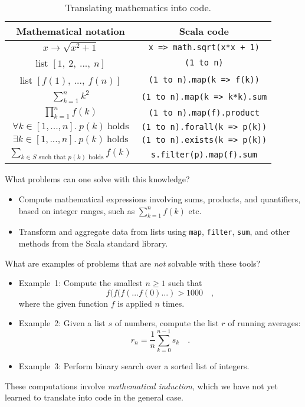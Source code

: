 \begin{table}
\begin{centering}
\begin{tabular}{|c|c|}
\hline 
\textbf{Mathematical notation} & \textbf{Scala code}\tabularnewline
\hline 
\hline 
$x\rightarrow\sqrt{x^{2}+1}$ & \lstinline!x => math.sqrt(x*x + 1)!\tabularnewline
\hline 
list $\left[1,~2,~...,~n\right]$ & \lstinline!(1 to n)!\tabularnewline
\hline 
list $\left[f(1),~...,~f(n)\right]$ & \lstinline!(1 to n).map(k => f(k))!\tabularnewline
\hline 
$\sum_{k=1}^{n}k^{2}$ & \lstinline!(1 to n).map(k => k*k).sum!\tabularnewline
\hline 
$\prod_{k=1}^{n}f(k)$ & \lstinline!(1 to n).map(f).product!\tabularnewline
\hline 
$\forall k\in[1,...,n].~p(k)~\text{holds}$ & \lstinline!(1 to n).forall(k => p(k))!\tabularnewline
\hline 
$\exists k\in[1,...,n].\:p(k)~\text{holds}$ & \lstinline!(1 to n).exists(k => p(k))!\tabularnewline
\hline 
${\displaystyle \sum_{k\in S\text{ such that }p(k)\text{ holds}}}f(k)$ & \lstinline!s.filter(p).map(f).sum!\tabularnewline
\hline 
\end{tabular}
\par\end{centering}
\caption{Translating mathematics into code.\label{tab:translating-mathematics-into-code}}
\end{table}

What problems can one solve with this knowledge?
\begin{itemize}
\item Compute mathematical expressions involving sums, products, and quantifiers,
based on integer ranges, such as $\sum_{k=1}^{n}f(k)$ etc.
\item Transform and aggregate data from lists using \lstinline!map!, \lstinline!filter!,\textbf{
}\lstinline!sum!, and other methods from the Scala standard library.
\end{itemize}
What are examples of problems that are \emph{not} solvable with these
tools?
\begin{itemize}
\item Example~1: Compute the smallest $n\geq1$ such that 
\[
f(f(f(...f(0)...)>1000\quad,
\]
where the given function $f$ is applied $n$ times.
\item Example~2: Given a list $s$ of numbers, compute the list $r$ of
running averages: 
\[
r_{n}=\frac{1}{n}\sum_{k=0}^{n-1}s_{k}\quad.
\]
\item Example~3: Perform binary search over a sorted list of integers.
\end{itemize}
These computations involve \emph{mathematical induction},
which we have not yet learned to translate into code in the general
case.

